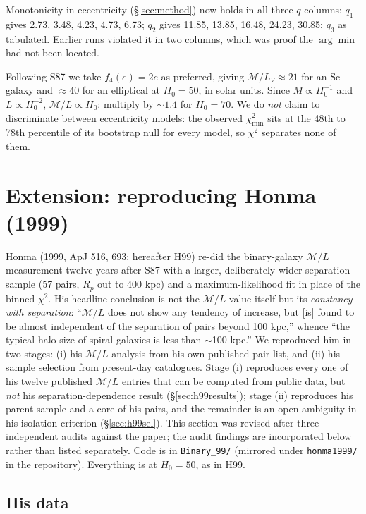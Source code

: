\documentclass[11pt]{article}
\newcommand{\ML}{\ensuremath{\mathcal{M}/L}}
\begin{document}
Monotonicity in eccentricity (\S\ref{sec:method}) now holds in all three $q$
columns: $q_1$ gives 2.73, 3.48, 4.23, 4.73, 6.73; $q_2$ gives 11.85, 13.85,
16.48, 24.23, 30.85; $q_3$ as tabulated. Earlier runs violated it in two
columns, which was proof the $\arg\min$ had not been located.

Following S87 we take $f_4(e) = 2e$ as preferred, giving
$\mathcal{M}/L_V \approx 21$ for an Sc galaxy and $\approx 40$ for an
elliptical at $H_0 = 50$, in solar units. Since $M \propto H_0^{-1}$ and
$L \propto H_0^{-2}$, $\ML \propto H_0$: multiply by ${\sim}1.4$ for
$H_0 = 70$. We do \emph{not} claim to discriminate between eccentricity models:
the observed $\chi^2_{\min}$ sits at the 48th to 78th percentile of its
bootstrap null for every model, so $\chi^2$ separates none of them.

\section{Extension: reproducing Honma (1999)}
\label{sec:honma}

Honma (1999, ApJ 516, 693; hereafter H99) re-did the binary-galaxy \ML{}
measurement twelve years after S87 with a larger, deliberately wider-separation
sample (57 pairs, $R_p$ out to 400 kpc) and a maximum-likelihood fit in place
of the binned $\chi^2$. His headline conclusion is not the \ML{} value itself
but its \emph{constancy with separation}: ``$\mathcal{M}/L$ does not show any
tendency of increase, but [is] found to be almost independent of the
separation of pairs beyond 100 kpc,'' whence ``the typical halo size of spiral
galaxies is less than $\sim$100 kpc.'' We reproduced him in two stages:
(i) his \ML{} analysis from his own published pair list, and (ii) his sample
selection from present-day catalogues. Stage (i) reproduces every one of his
twelve published \ML{} entries that can be computed from public data, but
\emph{not} his separation-dependence result (\S\ref{sec:h99results}); stage
(ii) reproduces his parent sample and a core of his pairs, and the remainder
is an open ambiguity in his isolation criterion (\S\ref{sec:h99sel}). This
section was revised after three independent audits against the paper; the
audit findings are incorporated below rather than listed separately. Code is
in \texttt{Binary\_99/} (mirrored under \texttt{honma1999/} in the repository).
Everything is at $H_0 = 50$, as in H99.

\subsection{His data}
\label{sec:h99data}
\end{document}
